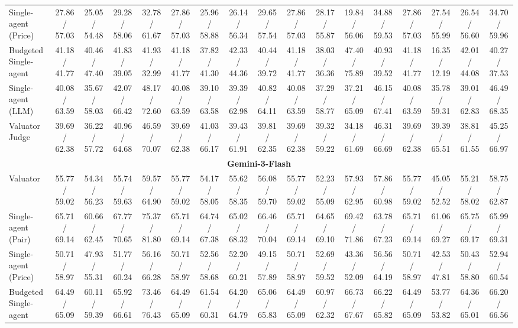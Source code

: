 \begin{table}[!t]
{\begin{tabular}{lcccccccccccccccc}
Single-agent (Price)         & 27.86 / 57.03 & 25.05 / 54.48 & 29.28 / 58.06 & 32.78 / 61.67 & 27.86 / 57.03 & 25.96 / 58.88 & 26.14 / 56.34 & 29.65 / 57.54 & 27.86 / 57.03 & 28.17 / 55.87 & 19.84 / 56.06 & 34.88 / 59.53 & 27.86 / 57.03 & 27.54 / 55.99 & 26.54 / 56.60 & 34.70 / 59.96 \\
Budgeted Single-agent        & 41.18 / 41.77 & 40.46 / 47.40 & 41.83 / 39.05 & 41.93 / 32.99 & 41.18 / 41.77 & 37.82 / 41.30 & 42.33 / 44.36 & 40.44 / 39.72 & 41.18 / 41.77 & 38.03 / 36.36 & 47.40 / 75.89 & 40.93 / 39.52 & 41.18 / 41.77 & 16.35 / 12.19 & 42.01 / 44.08 & 40.27 / 37.53 \\
Single-agent (LLM)           & 40.08 / 63.59 & 35.67 / 58.03 & 42.07 / 66.42 & 48.17 / 72.60 & 40.08 / 63.59 & 39.10 / 63.58 & 39.39 / 62.98 & 40.82 / 64.11 & 40.08 / 63.59 & 37.29 / 58.77 & 37.21 / 65.09 & 46.15 / 67.41 & 40.08 / 63.59 & 35.78 / 59.31 & 39.01 / 62.83 & 46.49 / 68.35 \\
Valuator Judge               & 39.69 / 62.38 & 36.22 / 57.72 & 40.96 / 64.68 & 46.59 / 70.07 & 39.69 / 62.38 & 41.03 / 66.17 & 39.43 / 61.91 & 39.81 / 62.35 & 39.69 / 62.38 & 39.32 / 59.22 & 34.18 / 61.69 & 46.31 / 66.69 & 39.69 / 62.38 & 39.39 / 65.51 & 38.81 / 61.55 & 45.25 / 66.97 \\
\midrule
\multicolumn{17}{c}{\textbf{Gemini-3-Flash}} \\
\midrule
Valuator                     & 55.77 / 59.02 & 54.34 / 56.23 & 55.74 / 59.63 & 59.57 / 64.90 & 55.77 / 59.02 & 54.17 / 58.05 & 55.62 / 58.35 & 56.08 / 59.70 & 55.77 / 59.02 & 52.23 / 55.09 & 57.93 / 62.95 & 57.86 / 60.98 & 55.77 / 59.02 & 45.05 / 52.52 & 55.21 / 58.02 & 58.75 / 62.87 \\
Single-agent (Pair)          & 65.71 / 69.14 & 60.66 / 62.45 & 67.77 / 70.65 & 75.37 / 81.80 & 65.71 / 69.14 & 64.74 / 67.38 & 65.02 / 68.32 & 66.46 / 70.04 & 65.71 / 69.14 & 64.65 / 69.10 & 69.42 / 71.86 & 63.78 / 67.23 & 65.71 / 69.14 & 61.06 / 69.27 & 65.75 / 69.17 & 65.99 / 69.31 \\
Single-agent (Price)         & 50.71 / 58.97 & 47.93 / 55.31 & 51.77 / 60.24 & 56.16 / 66.28 & 50.71 / 58.97 & 52.56 / 58.68 & 52.20 / 60.21 & 49.15 / 57.89 & 50.71 / 58.97 & 52.69 / 59.52 & 43.36 / 52.09 & 56.56 / 64.19 & 50.71 / 58.97 & 42.53 / 47.81 & 50.43 / 58.80 & 52.94 / 60.54 \\
Budgeted Single-agent        & 64.49 / 65.09 & 60.11 / 59.39 & 65.92 / 66.61 & 73.46 / 76.43 & 64.49 / 65.09 & 61.54 / 60.31 & 64.20 / 64.79 & 65.06 / 65.83 & 64.49 / 65.09 & 60.97 / 62.32 & 66.73 / 67.67 & 66.22 / 65.82 & 64.49 / 65.09 & 53.77 / 53.82 & 64.36 / 65.01 & 66.20 / 66.56 \\

\end{tabular}}
\end{table}
